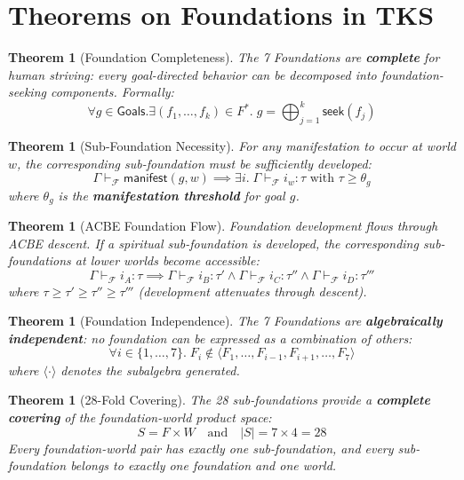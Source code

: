 \documentclass[11pt,twoside,openright]{book}
\theoremstyle{definition}
\theoremstyle{plain}
\newtheorem{theorem}[definition]{Theorem}
\theoremstyle{remark}
\newcommand{\Foundations}{\mathcal{F}}
\begin{document}
\section{Theorems on Foundations in TKS}
\label{sec:foundation-theorems}

\begin{theorem}[Foundation Completeness]
\label{thm:foundation-completeness}
The 7 Foundations are \textbf{complete} for human striving: every goal-directed behavior can be decomposed into foundation-seeking components. Formally:
\[
\forall g \in \mathsf{Goals}. \exists (f_1, \ldots, f_k) \in F^*. \; g = \bigoplus_{j=1}^{k} \mathsf{seek}(f_j)
\]
\end{theorem}

\begin{theorem}[Sub-Foundation Necessity]
\label{thm:subfound-necessity}
For any manifestation to occur at world $w$, the corresponding sub-foundation must be sufficiently developed:
\[
\Gamma \vdash_\Foundations \mathsf{manifest}(g, w) \implies \exists i. \; \Gamma \vdash_\Foundations i_w : \tau \text{ with } \tau \geq \theta_g
\]
where $\theta_g$ is the \textbf{manifestation threshold} for goal $g$.
\end{theorem}

\begin{theorem}[ACBE Foundation Flow]
\label{thm:acbe-foundation-flow}
Foundation development flows through ACBE descent. If a spiritual sub-foundation is developed, the corresponding sub-foundations at lower worlds become accessible:
\[
\Gamma \vdash_\Foundations i_A : \tau \implies \Gamma \vdash_\Foundations i_B : \tau' \land \Gamma \vdash_\Foundations i_C : \tau'' \land \Gamma \vdash_\Foundations i_D : \tau'''
\]
where $\tau \geq \tau' \geq \tau'' \geq \tau'''$ (development attenuates through descent).
\end{theorem}

\begin{theorem}[Foundation Independence]
\label{thm:foundation-independence}
The 7 Foundations are \textbf{algebraically independent}: no foundation can be expressed as a combination of others:
\[
\forall i \in \{1, \ldots, 7\}. \; F_i \notin \langle F_1, \ldots, F_{i-1}, F_{i+1}, \ldots, F_7 \rangle
\]
where $\langle \cdot \rangle$ denotes the subalgebra generated.
\end{theorem}

\begin{theorem}[28-Fold Covering]
\label{thm:28-fold-covering}
The 28 sub-foundations provide a \textbf{complete covering} of the foundation-world product space:
\[
S = F \times W \quad \text{and} \quad |S| = 7 \times 4 = 28
\]
Every foundation-world pair has exactly one sub-foundation, and every sub-foundation belongs to exactly one foundation and one world.
\end{theorem}
\end{document}
